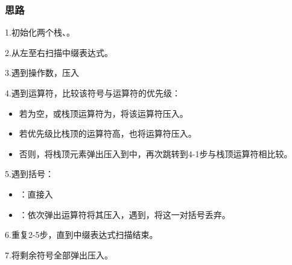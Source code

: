 \documentclass[a4paper]{report}
\begin{document}
\subsubsection{思路}
1.初始化两个栈、。

2.从左至右扫描中缀表达式。

3.遇到操作数，压入

4.遇到运算符，比较该符号与运算符的优先级：
\begin{itemize}
  \item 若为空，或栈顶运算符为\dm{(}，将该运算符压入。
  \item 若优先级比栈顶的运算符高，也将运算符压入。
  \item 否则，将栈顶元素弹出压入到中，再次跳转到4-1步与栈顶运算符相比较。
\end{itemize}

5.遇到括号：
\begin{itemize}
  \item \dm{(}：直接入
  \item \dm{)}：依次弹出运算符将其压入，遇到\dm{(}，将这一对括号丢弃。
\end{itemize}

6.重复2-5步，直到中缀表达式扫描结束。

7.将剩余符号全部弹出压入。
\end{document}
